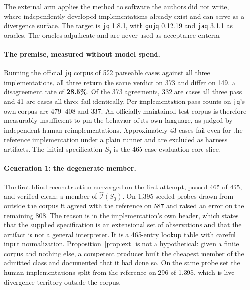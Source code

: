 \documentclass[10pt,twocolumn]{article}
\begin{document}
The external arm applies the method to software the authors did not
write, where independently developed implementations already exist and
can serve as a divergence surface. The target is \texttt{jq} 1.8.1, with
\texttt{gojq} 0.12.19 and \texttt{jaq} 3.1.1 as oracles. The oracles
adjudicate and are never used as acceptance criteria.

\paragraph{The premise, measured without model spend.} Running the
official \texttt{jq} corpus of 522 parseable cases against all three
implementations, all three return the same verdict on 373 and differ on
149, a disagreement rate of \textbf{28.5\%}. Of the 373 agreements, 332
are cases all three pass and 41 are cases all three fail identically.
Per-implementation pass counts on \texttt{jq}'s own corpus are 479, 408
and 337. An officially maintained
test corpus is therefore measurably insufficient to pin the behavior of
its own language, as judged by independent human
reimplementations. Approximately 43 cases fail even for the reference
implementation under a plain runner and are excluded as harness
artifacts. The initial specification $S_0$ is the 465-case evaluation-core
slice.

\paragraph{Generation 1: the degenerate member.} The first blind
reconstruction converged on the first attempt, passed 465 of 465, and
verified clean: a member of $\widehat{\mathcal{I}}(S_0)$. On 1{,}395
seeded probes drawn from outside the corpus it agreed with the reference
on 587 and raised an error on the remaining 808. The reason is in the
implementation's own header, which states that the supplied specification
is an extensional set of observations and that the artifact is not a
general interpreter. It is a 465-entry lookup table with careful input
normalization. Proposition~\ref{prop:ext} is not a hypothetical: given a
finite corpus and nothing else, a competent producer built the cheapest
member of the admitted class and documented that it had done so. On the
same probe set the human implementations split from the reference on 296
of 1{,}395, which is live divergence territory outside the corpus.
\end{document}
